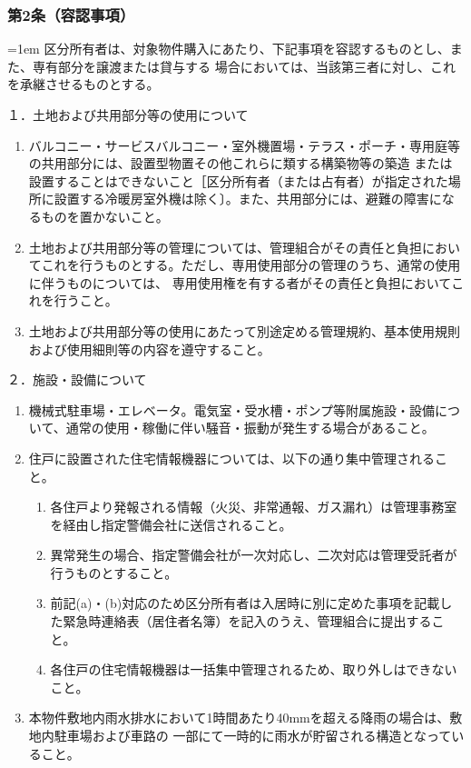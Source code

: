 \documentclass[
  luatex,
  paper=a4paper,
  fontsize=11pt,
  jafontsize=11pt,
  jlreq_notes,
]{jlreq}
\newcommand{\joumain}[1]{%
  \noindent\hangindent=1em\hangafter=1
  \hspace{1em}#1%
}
\begin{document}
  \subsubsection*{第2条（容認事項）}
  \joumain{区分所有者は、対象物件購入にあたり、下記事項を容認するものとし、また、専有部分を譲渡または貸与する
  場合においては、当該第三者に対し、これを承継させるものとする。}

  \noindent
  １．土地および共用部分等の使用について
  \begin{enumerate}
    \item バルコニー・サービスバルコニー・室外機置場・テラス・ポーチ・専用庭等の共用部分には、設置型物置その他これらに類する構築物等の築造
    または設置することはできないこと［区分所有者（または占有者）が指定された場所に設置する冷暖房室外機は除く〕。また、共用部分には、避難の障害になるものを置かないこと。
    \item 土地および共用部分等の管理については、管理組合がその責任と負担においてこれを行うものとする。ただし、専用使用部分の管理のうち、通常の使用に伴うものについては、
          専用使用権を有する者がその責任と負担においてこれを行うこと。
    \item 土地および共用部分等の使用にあたって別途定める管理規約、基本使用規則および使用細則等の内容を遵守すること。
  \end{enumerate}
  ２．施設・設備について
  \begin{enumerate}
  \item 機械式駐車場・エレベータ。電気室・受水槽・ポンプ等附属施設・設備について、通常の使用・稼働に伴い騒音・振動が発生する場合があること。
  \item 住戸に設置された住宅情報機器については、以下の通り集中管理されること。
  \begin{enumerate}
    \item 各住戸より発報される情報（火災、非常通報、ガス漏れ）は管理事務室を経由し指定警備会社に送信されること。
    \item 異常発生の場合、指定警備会社が一次対応し、二次対応は管理受託者が行うものとすること。
    \item 前記(a)・(b)対応のため区分所有者は入居時に別に定めた事項を記載した緊急時連絡表（居住者名簿）を記入のうえ、管理組合に提出すること。
    \item 各住戸の住宅情報機器は一括集中管理されるため、取り外しはできないこと。
  \end{enumerate}
  \item 本物件敷地内雨水排水において1時間あたり40mmを超える降雨の場合は、敷地内駐車場および車路の
        一部にて一時的に雨水が貯留される構造となっていること。
  \end{enumerate}
\end{document}
